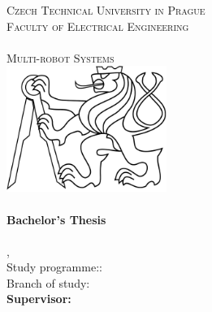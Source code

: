 
\begin{titlepage}
  \begin{center}

    \textsc{\Large Czech Technical University in Prague}\\[1em]
    \textsc{\large Faculty of Electrical Engineering\\
    \Department\\
    Multi-robot Systems\\[3em]
    }
    \includegraphics[height=4.1cm]{fig/ctu_lion.pdf}\\[3em]

    \textbf{\textsc{\Huge \Title}}\\[2em]

    \textbf{\Large Bachelor's Thesis}\\[6em]

    \textbf{\huge \Author}\\[6em]

    {\large \Location, \Date}\\[3em]

    Study programme:: \Programme\\
    Branch of study: \Field\\[4em]

    \textbf{Supervisor: \Supervisor}\\

    \vspace{2pt}

  \end{center}
\end{titlepage}
